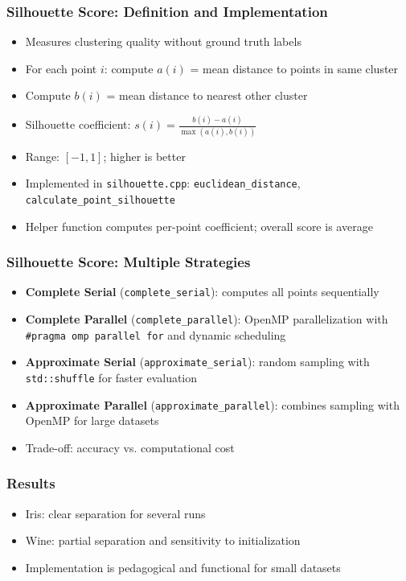 \documentclass{beamer}
\begin{document}
\begin{frame}\frametitle{Silhouette Score: Definition and Implementation}
    \begin{itemize}
        \item Measures clustering quality without ground truth labels
        \item For each point $i$: compute $a(i)$ = mean distance to points in same cluster
        \item Compute $b(i)$ = mean distance to nearest other cluster
        \item Silhouette coefficient: $s(i) = \frac{b(i) - a(i)}{\max(a(i), b(i))}$
        \item Range: $[-1, 1]$; higher is better
        \item Implemented in \texttt{silhouette.cpp}: \texttt{euclidean\_distance}, \texttt{calculate\_point\_silhouette}
        \item Helper function computes per-point coefficient; overall score is average
    \end{itemize}
\end{frame}

\begin{frame}\frametitle{Silhouette Score: Multiple Strategies}
    \begin{itemize}
        \item \textbf{Complete Serial} (\texttt{complete\_serial}): computes all points sequentially
        \item \textbf{Complete Parallel} (\texttt{complete\_parallel}): OpenMP parallelization with \texttt{\#pragma omp parallel for} and dynamic scheduling
        \item \textbf{Approximate Serial} (\texttt{approximate\_serial}): random sampling with \texttt{std::shuffle} for faster evaluation
        \item \textbf{Approximate Parallel} (\texttt{approximate\_parallel}): combines sampling with OpenMP for large datasets
        \item Trade-off: accuracy vs. computational cost
    \end{itemize}
\end{frame}

\begin{frame}\frametitle{Results}
    \begin{itemize}
        \item Iris: clear separation for several runs
        \item Wine: partial separation and sensitivity to initialization
        \item Implementation is pedagogical and functional for small datasets
    \end{itemize}
\end{frame}
\end{document}
